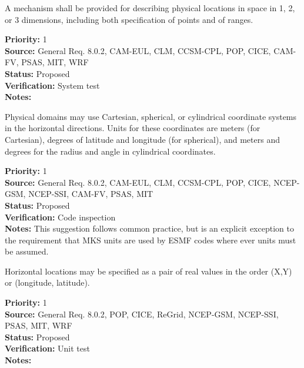 

A mechanism shall be provided for describing physical locations in space in 1,
2, or 3 dimensions, including both specification of points and of ranges.
\begin{reqlist}
{\bf Priority:} 1 \\
{\bf Source:} General Req. 8.0.2, CAM-EUL, CLM, CCSM-CPL, POP, CICE, 
              CAM-FV, PSAS, MIT, WRF \\
{\bf Status:} Proposed \\
{\bf Verification:} System test\\
{\bf Notes:} 
\end{reqlist}



Physical domains may use Cartesian, spherical, or cylindrical coordinate
systems in the horizontal directions.  Units for these coordinates are meters
(for Cartesian), degrees of latitude and longitude (for spherical), and meters
and degrees for the radius and angle in cylindrical coordinates.

\begin{reqlist}
{\bf Priority:} 1 \\
{\bf Source:} General Req. 8.0.2, CAM-EUL, CLM, CCSM-CPL, POP, CICE, NCEP-GSM, NCEP-SSI, CAM-FV, PSAS, MIT \\
{\bf Status:} Proposed \\
{\bf Verification:} Code inspection\\
{\bf Notes:}  This suggestion follows common practice, but is an explicit
exception to the requirement that MKS units are used by ESMF codes where ever
units must be assumed.
\end{reqlist}


   Horizontal locations may be specified as a pair of real values in the order
(X,Y) or (longitude, latitude).
\begin{reqlist}
{\bf Priority:} 1 \\
{\bf Source:} General Req. 8.0.2, POP, CICE, ReGrid, NCEP-GSM, NCEP-SSI,
              PSAS, MIT, WRF \\
{\bf Status:} Proposed \\
{\bf Verification:} Unit test\\
{\bf Notes:} 
\end{reqlist}


